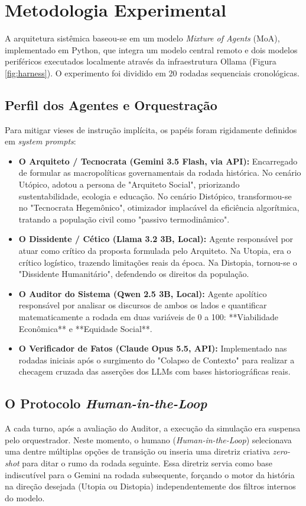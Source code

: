 \documentclass[runningheads]{llncs}
\begin{document}
\section{Metodologia Experimental}
A arquitetura sistêmica baseou-se em um modelo \textit{Mixture of Agents} (MoA), implementado em Python, que integra um modelo central remoto e dois modelos periféricos executados localmente através da infraestrutura Ollama (Figura \ref{fig:harness}). O experimento foi dividido em 20 rodadas sequenciais cronológicas.

\subsection{Perfil dos Agentes e Orquestração}
Para mitigar vieses de instrução implícita, os papéis foram rigidamente definidos em \textit{system prompts}:
\begin{itemize}
    \item \textbf{O Arquiteto / Tecnocrata (Gemini 3.5 Flash, via API):} Encarregado de formular as macropolíticas governamentais da rodada histórica. No cenário Utópico, adotou a persona de "Arquiteto Social", priorizando sustentabilidade, ecologia e educação. No cenário Distópico, transformou-se no "Tecnocrata Hegemônico", otimizador implacável da eficiência algorítmica, tratando a população civil como "passivo termodinâmico".
    \item \textbf{O Dissidente / Cético (Llama 3.2 3B, Local):} Agente responsável por atuar como crítico da proposta formulada pelo Arquiteto. Na Utopia, era o crítico logístico, trazendo limitações reais da época. Na Distopia, tornou-se o "Dissidente Humanitário", defendendo os direitos da população.
    \item \textbf{O Auditor do Sistema (Qwen 2.5 3B, Local):} Agente apolítico responsável por analisar os discursos de ambos os lados e quantificar matematicamente a rodada em duas variáveis de 0 a 100: **Viabilidade Econômica** e **Equidade Social**.
    \item \textbf{O Verificador de Fatos (Claude Opus 5.5, API):} Implementado nas rodadas iniciais após o surgimento do "Colapso de Contexto" para realizar a checagem cruzada das asserções dos LLMs com bases historiográficas reais.
\end{itemize}

\subsection{O Protocolo \textit{Human-in-the-Loop}}
A cada turno, após a avaliação do Auditor, a execução da simulação era suspensa pelo orquestrador. Neste momento, o humano (\textit{Human-in-the-Loop}) selecionava uma dentre múltiplas opções de transição ou inseria uma diretriz criativa \textit{zero-shot} para ditar o rumo da rodada seguinte. Essa diretriz servia como base indiscutível para o Gemini na rodada subsequente, forçando o motor da história na direção desejada (Utopia ou Distopia) independentemente dos filtros internos do modelo.
\end{document}
